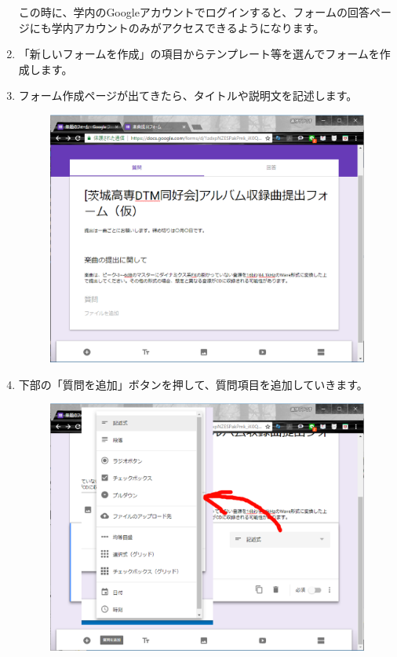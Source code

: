 \documentclass[11pt,a4paper]{jsarticle}
\begin{document}
\begin{enumerate}
                        この時に、学内のGoogleアカウントでログインすると、フォームの回答ページにも学内アカウントのみがアクセスできるようになります。
                \item 「新しいフォームを作成」の項目からテンプレート等を選んでフォームを作成します。
                \item フォーム作成ページが出てきたら、タイトルや説明文を記述します。
                    \begin{figure}[htbp]
                        \begin{center}
                        \includegraphics[width=12.0cm]{./form02.eps}
                        \label{fig:form02}
                        \end{center}
                    \end{figure}
                \item 下部の「質問を追加」ボタンを押して、質問項目を追加していきます。
                    \begin{figure}[htbp]
                        \begin{center}
                        \includegraphics[width=12.0cm]{./form03.eps}
                        \label{fig:form03}
                        \end{center}
                    \end{figure}
                    

\end{enumerate}
\end{document}
